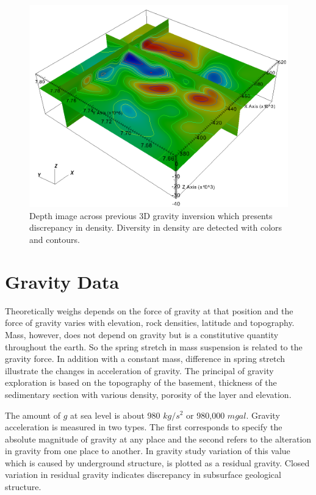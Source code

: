 \begin{figure}
\centering
\includegraphics[width=\textwidth]{density11.png}
\caption{Depth image across previous 3D gravity inversion which presents discrepancy in density. Diversity in density are detected with colors and contours.}
\end{figure}





\section{Gravity Data}
Theoretically weighs depends on the force of gravity at 
that position and the force of gravity varies with elevation, rock densities, latitude and topography. 
Mass, however, does not depend on gravity but is a constitutive quantity throughout the earth. So the
spring stretch in mass suspension is related to the gravity force. In addition with a constant mass, 
difference in spring stretch illustrate the changes in acceleration of gravity. The principal of gravity exploration 
is based on the topography of the basement, thickness of the sedimentary section with various density, porosity of 
the layer and elevation.

The amount of $g$ at sea level is about 980 $kg/s^2$ or 980,000 $mgal$. Gravity acceleration 
is measured in two types. The first corresponds to specify the absolute magnitude of gravity 
at any place and the second refers to the alteration in gravity from one place to another. 
In gravity study variation of this value which is caused by underground structure, is plotted as a residual gravity.
Closed variation in residual gravity indicates discrepancy in subsurface geological structure.

